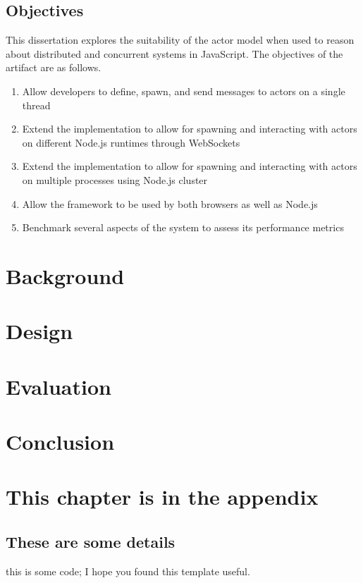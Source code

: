 \documentclass[12pt, a4paper]{report}
\newenvironment{code}
{\footnotesize\verbatim}{\endverbatim\normalfont}
\theoremstyle{definition}
\theoremstyle{definition}%
\theoremstyle{definition}%
\theoremstyle{definition}%
\theoremstyle{definition}%
\theoremstyle{definition}%
\begin{document}
\section{Objectives}
This dissertation explores the suitability of the actor model when used to reason about distributed and concurrent systems in JavaScript. The objectives of the artifact are as follows.
\begin{enumerate}
    \item Allow developers to define, spawn, and send messages to actors on a single thread
    \item Extend the implementation to allow for spawning and interacting with actors on different Node.js runtimes through WebSockets
    \item Extend the implementation to allow for spawning and interacting with actors on multiple processes using Node.js cluster
    \item Allow the framework to be used by both browsers as well as Node.js
    \item Benchmark several aspects of the system to assess its performance metrics
\end{enumerate}
\chapter{Background}

\chapter{Design}

\chapter{Evaluation}

\chapter{Conclusion}

\appendix

\chapter{This chapter is in the appendix}
\section{These are some details}
\begin{code}
this is some code;
I hope you found this template useful.
\end{code}


\bibliomatter





 
\end{document}
